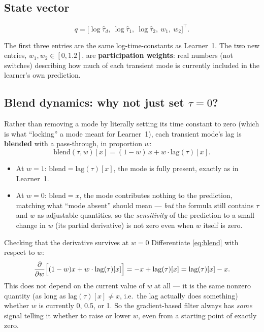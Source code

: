\documentclass[11pt,a4paper]{article}
\begin{document}
\subsection{State vector}

\begin{equation}
q = \bigl[\log\hat\tau_d,\ \log\hat\tau_1,\ \log\hat\tau_2,\ w_1,\ w_2\bigr]^\top.
\label{eq:state2}
\end{equation}

The first three entries are the same log-time-constants as Learner~1. The two
new entries, $w_1,w_2\in[0,1.2]$, are \textbf{participation weights}: real
numbers (not switches) describing how much of each transient mode is
currently included in the learner's own prediction.

\subsection{Blend dynamics: why not just set $\tau=0$?}

Rather than removing a mode by literally setting its time constant to zero
(which is what ``locking'' a mode meant for Learner~1), each transient mode's
lag is \textbf{blended} with a pass-through, in proportion $w$:
\begin{equation}
\mathrm{blend}(\tau,w)[x] = (1-w)\,x + w\cdot\mathrm{lag}(\tau)[x].
\label{eq:blend}
\end{equation}

\begin{itemize}[nosep]
\item At $w=1$: $\mathrm{blend}=\mathrm{lag}(\tau)[x]$, the mode is fully
  present, exactly as in Learner~1.
\item At $w=0$: $\mathrm{blend}=x$, the mode contributes nothing to the
  prediction, matching what ``mode absent'' should mean --- \emph{but} the
  formula still contains $\tau$ and $w$ as adjustable quantities, so the
  \emph{sensitivity} of the prediction to a small change in $w$ (its partial
  derivative) is not zero even when $w$ itself is zero.
\end{itemize}

\begin{stepbox}{Checking that the derivative survives at $w=0$}
Differentiate \eqref{eq:blend} with respect to $w$:
\[
\frac{\partial}{\partial w}\Bigl[(1-w)x + w\cdot\mathrm{lag}(\tau)[x]\Bigr]
= -x + \mathrm{lag}(\tau)[x] = \mathrm{lag}(\tau)[x] - x.
\]
This does not depend on the current value of $w$ at all --- it is the same
nonzero quantity (as long as $\mathrm{lag}(\tau)[x]\ne x$, i.e.\ the lag
actually does something) whether $w$ is currently 0, 0.5, or 1. So the
gradient-based filter always has \emph{some} signal telling it whether to
raise or lower $w$, even from a starting point of exactly zero.
\end{stepbox}
\end{document}
